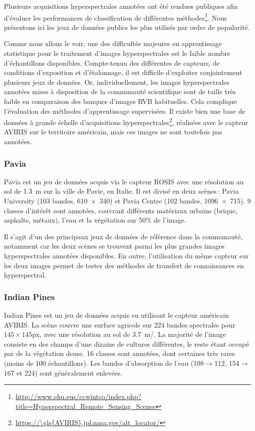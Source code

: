 Plusieurs acquisitions hyperspectrales annotées ont été rendues publiques afin d'évaluer les performances de classification de différentes méthodes\footnote{\url{http://www.ehu.eus/ccwintco/index.php?title=Hyperspectral_Remote_Sensing_Scenes}}. Nous présentons ici les jeux de données publics les plus utilisés par ordre de popularité.

Comme nous allons le voir, une des difficultés majeures en apprentissage statistique pour le traitement d'images hyperspectrales est le faible nombre d'échantillons disponibles. Compte-tenuu des différentes de capteurs, de conditions d'exposition et d'étalonnage, il est difficile d'exploiter conjointement plusieurs jeux de données. Or, individuellement, les images hyperspectrales annotées mises à disposition de la communauté scientifique sont de taille très faible en comparaison des banques d'images \gls{RVB} habituelles. Cela complique l'évaluation des méthodes d'apprentissage supervisées. Il existe bien une base de données à grande échelle d'acquisitions hyperspectrales\footnote{\url{https://\gls{AVIRIS}.jpl.nasa.gov/alt_locator/}}, réalisées avec le capteur \gls{AVIRIS} sur le territoire américain, mais ces images ne sont toutefois pas annotées.

\subsubsection{Pavia}

Pavia est un jeu de données acquis via le capteur ROSIS avec une résolution au sol de \SI{1,3}{\meter} sur la ville de Pavie, en Italie. Il est divisé en deux scènes\,: Pavia University (103 bandes, \SI{610x340}{\px}) et Pavia Centre (102 bandes, \SI{1096x715}{\px}). 9 classes d'intérêt sont annotées, couvrant différents matériaux urbains (brique, asphalte, métaux), l'eau et la végétation sur 50\% de l'image.

Il s'agit d'un des principaux jeux de données de référence dans la communauté, notamment car les deux scènes se trouvent parmi les plus grandes images hyperspectrales annotées disponibles. En outre, l'utilisation du même capteur sur les deux images permet de tester des méthodes de transfert de connaissances en hyperspectral.

\subsubsection{Indian Pines}

Indian Pines est un jeu de données acquis en utilisant le capteur américain \gls{AVIRIS}. La scène couvre une surface agricole sur 224 bandes spectrales pour $145\times145$px, avec une résolution au sol de \SI{3,7}{\meter/\px}. La majorité de l'image consiste en des champs d'une dizaine de cultures différentes, le reste étant occupé par de la végétation dense. 16 classes sont annotées, dont certaines très rares (moins de 100 échantillons). Les bandes d'absorption de l'eau (108$\rightarrow$112, 154$\rightarrow$167 et 224) sont généralement enlevées.

